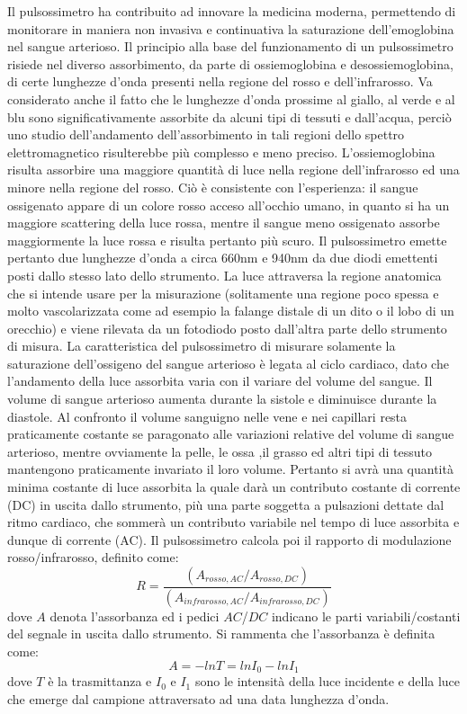 \documentclass[12pt,a4paper, twoside, openright]{report}
\begin{document}
Il pulsossimetro ha contribuito ad innovare la medicina moderna, permettendo di monitorare in maniera non invasiva e continuativa la saturazione dell'emoglobina nel sangue arterioso. 
Il principio alla base del funzionamento di un pulsossimetro risiede nel diverso assorbimento, da parte di ossiemoglobina e desossiemoglobina, di certe lunghezze d'onda presenti nella regione del rosso e dell'infrarosso. 
Va considerato anche il fatto che le lunghezze d'onda prossime al giallo, al verde e al blu sono significativamente assorbite da alcuni tipi di tessuti e dall'acqua, perciò uno studio dell'andamento dell'assorbimento in tali regioni dello spettro elettromagnetico risulterebbe più complesso e meno preciso. 
L'ossiemoglobina risulta assorbire una maggiore quantità di luce nella regione dell'infrarosso ed una minore nella regione del rosso. 
Ciò è consistente con l'esperienza: il sangue ossigenato appare di un colore rosso acceso all'occhio umano, in quanto si ha un maggiore scattering della luce rossa, mentre il sangue meno ossigenato assorbe maggiormente la luce rossa e risulta pertanto più scuro. 
Il pulsossimetro emette pertanto due lunghezze d'onda a circa 660nm e 940nm da due diodi emettenti posti dallo stesso lato dello strumento. 
La luce attraversa la regione anatomica che si intende usare per la misurazione (solitamente una regione poco spessa e molto vascolarizzata come ad esempio la falange distale di un dito o il lobo di un orecchio) e viene rilevata da un fotodiodo posto dall'altra parte dello strumento di misura. 
La caratteristica del pulsossimetro di misurare solamente la saturazione dell'ossigeno del sangue arterioso è legata al ciclo cardiaco, dato che l'andamento della luce assorbita varia con il variare del volume del sangue. 
Il volume di sangue arterioso aumenta durante la sistole e diminuisce durante la diastole. 
Al confronto il volume sanguigno nelle vene e nei capillari resta praticamente costante se paragonato alle variazioni relative del volume di sangue arterioso, mentre ovviamente la pelle, le ossa ,il grasso ed altri tipi di tessuto mantengono praticamente invariato il loro volume. 
Pertanto si avrà una quantità minima costante di luce assorbita la quale darà un contributo costante di corrente (DC) in uscita dallo strumento, più una parte soggetta a pulsazioni dettate dal ritmo cardiaco, che sommerà un contributo variabile nel tempo di luce assorbita e dunque di corrente (AC). 
Il pulsossimetro calcola poi il rapporto di modulazione rosso/infrarosso, definito come:
\begin{equation}
    \label{eq:R}
    R=\frac{(A_{rosso,AC}/A_{rosso,DC})}{(A_{infrarosso,AC}/A_{infrarosso,DC})}
\end{equation}
dove $A$ denota l'assorbanza ed i pedici $AC$/$DC$ indicano le parti variabili/costanti del segnale in uscita dallo strumento. 
Si rammenta che l'assorbanza è definita come:
\begin{equation}
    \label{eq:Absorbance}
    A = -ln T = ln I_{0} - ln I_{1}
\end{equation}
dove $T$ è la trasmittanza e $I_{0}$ e $I_{1}$ sono le intensità della luce incidente e della luce che emerge dal campione attraversato ad una data lunghezza d'onda. 
\newline
\end{document}
